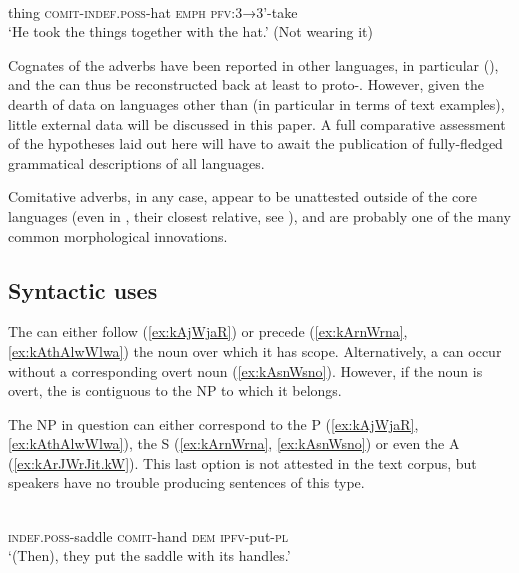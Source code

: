 \documentclass[output=paper]{langsci/langscibook}
\begin{document}
\begin{exe}
\ex \label{ex:kAGWtArtWrte}
\gll  {} 	 	 	  \\
thing \textsc{comit-indef.poss}-hat \textsc{emph} \textsc{pfv}:\textsc{3}→\textsc{3}'-take \\
\glt `He took the things together with the hat.' (Not wearing it)
\end{exe}

Cognates of the   adverbs have been reported in other  languages, in particular   (\citealt[107]{jackson98morphology}), and the   can thus be reconstructed back at least to proto-. However, given the dearth of data on languages other than  (in particular in terms of text examples), little external data will be discussed in this paper. A full comparative assessment of the hypotheses laid out here will have to await the publication of fully-fledged grammatical descriptions of all  languages. 

Comitative adverbs, in any case, appear to be unattested outside of the core  languages (even in , their closest relative, see \citealt{lai13affixale}), and are probably one of the many common   morphological innovations.

\subsection{Syntactic uses} 

The  can either follow (\ref{ex:kAjWjaR}) or precede (\ref{ex:kArnWrna}, \ref{ex:kAthAlwWlwa}) the noun over which it has scope. Alternatively, a  can occur without a corresponding overt noun (\ref{ex:kAsnWsno}). However, if the noun is overt, the  is contiguous to the NP to which it belongs. 

The NP in question can either correspond to the P (\ref{ex:kAjWjaR}, \ref{ex:kAthAlwWlwa}), the S (\ref{ex:kArnWrna}, \ref{ex:kAsnWsno}) or even the A (\ref{ex:kArJWrJit.kW}). This last option is not attested in the text corpus, but speakers have no trouble producing sentences of this type.

\begin{exe}
\ex \label{ex:kAjWjaR}
\gll
{}  	  	  	  \\
\textsc{indef.poss}-saddle \textsc{comit}-hand \textsc{dem} \textsc{ipfv}-put-\textsc{pl} \\
\glt `(Then), they put the saddle with its handles.'
\end{exe}
\end{document}
